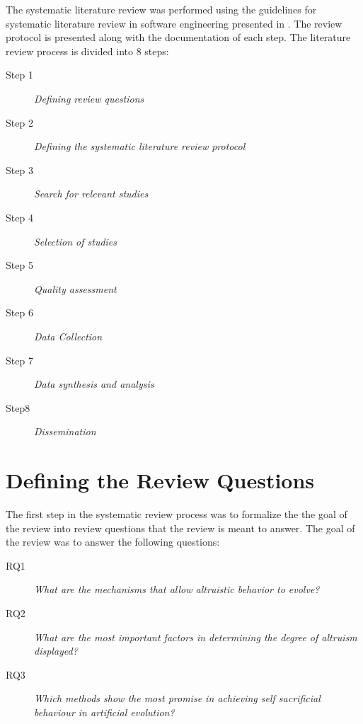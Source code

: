 \documentclass[a4paper]{book}
\begin{document}
The systematic literature review was performed using the guidelines for systematic 
literature review in software engineering presented in \cite{keele_guidelines_2007}.
The review protocol is presented along with the documentation of each step.
The literature review process is divided into 8 steps: %

\begin{description}
\item[Step 1] {\it Defining review questions}

\item[Step 2] {\it Defining the systematic literature review protocol}

\item[Step 3] {\it Search for relevant studies}

\item[Step 4] {\it Selection of studies}

\item[Step 5] {\it Quality assessment}

\item[Step 6] {\it Data Collection}

\item[Step 7] {\it Data synthesis and analysis}

\item[Step8] {\it Dissemination}

\end{description}

\clearpage 

\section{Defining the Review Questions}
The first step in the systematic review process was to formalize the the goal of the review into review questions that the review is meant to answer. The goal of the review was to answer the following questions:

\begin{description}
\item[RQ1] {\it What are the mechanisms that allow altruistic behavior to evolve?} 
\item[RQ2] {\it What are the most important factors in determining the degree of altruism displayed?}
\item[RQ3] {\it Which methods show the most promise in achieving self sacrificial behaviour in artificial evolution?}

\end{description}
\end{document}
